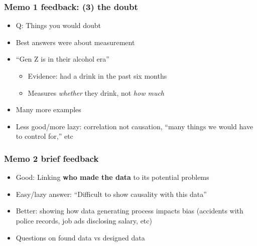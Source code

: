\begin{frame}
\frametitle{Memo 1 feedback: (3) the doubt}
\centering

\vspace{5pt}
\begin{itemize}
  \item Q: Things you would doubt
  \item Best answers were about measurement
  \vspace{8pt}
  \item<2-> ``Gen Z is in their alcohol era''
  \begin{itemize}
    \item<2-> Evidence: had a drink in the past six months
    \item<2-> Measures \textit{whether} they drink, not \textit{how much}
  \end{itemize}
  \item Many more examples
  \vspace{8pt}
  \item<3-> Less good/more lazy: correlation not causation, ``many things we would have to control for,'' etc
\end{itemize}

\end{frame}
\note{}

\begin{frame}
\frametitle{Memo 2 brief feedback}
\centering

\vspace{5pt}
\begin{itemize}
  \item Good: Linking \textbf{who made the data} to its potential problems
  \item Easy/lazy answer: ``Difficult to show causality with this data''
  \item Better: showing how data generating process impacts bias (accidents with police records, job ads disclosing salary, etc)
  \item Questions on found data vs designed data
\end{itemize}

\end{frame}
\note{}

